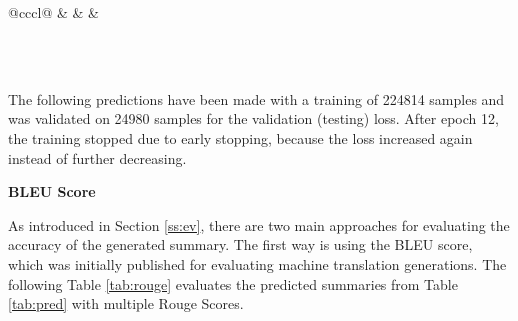 \begin{table}[]
\begin{tabular}{@{}cccl@{}}
		 &                                                  &            &  \\ \bottomrule
	\end{tabular} \\ \\
	\caption{\label{tab:pred}This table shows some example outputs for the training data from my trained model} 
\end{table}

The following predictions have been made with a training of 224814 samples and was validated on 24980 samples for the validation (testing) loss. After epoch 12, the training stopped due to early stopping, because the loss increased again instead of further decreasing. 

\textbf{BLEU Score}

As introduced in Section \ref{ss:ev}, there are two main approaches for evaluating the accuracy of the generated summary. The first way is using the BLEU score, which was initially published for evaluating machine translation generations. The following Table \ref{tab:rouge} evaluates the predicted summaries from Table \ref{tab:pred} with multiple Rouge Scores.


